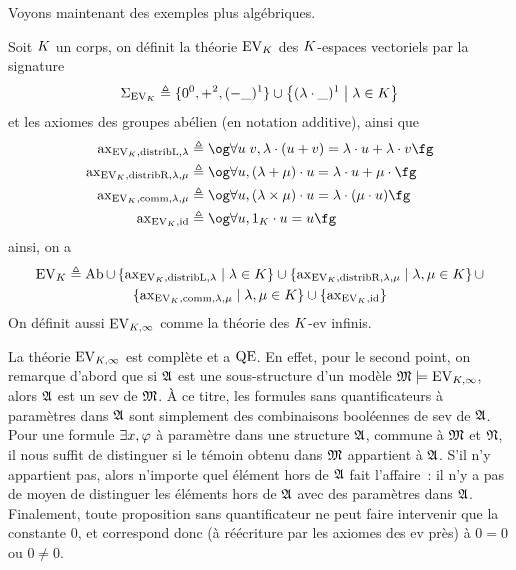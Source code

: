\noindent
Voyons maintenant des exemples plus algébriques.

\begin{example}
  Soit $K$ un corps, on définit la théorie $\operatorname{EV}_{K}$ des
  $K$-espaces vectoriels par la signature
  \[\Sigma_{\operatorname{EV}_{K}} \triangleq \{ 0^0, +^{2}, (-\mathord{\_})^1\}\cup
  \left\{ (\lambda\mathbin{\cdot}\mathord{\_})^1 \;\middle\vert\; \lambda\in K \right\}\]
  et les axiomes des groupes abélien (en notation additive), ainsi que
  \begin{align*}
    \Rax_{\EV_{\varKK},\distrL,\lambda} &\defeq \ogM \forall u\;v,
    \lambda\mathbin{\cdot}(u+v) = \lambda\mathbin{\cdot} u +
    \lambda\mathbin{\cdot} v\fgM\\
    \Rax_{\EV_{\varKK},\distrR,\lambda,\mu} &\defeq
    \ogM\forall u, (\lambda + \mu)\mathbin{\cdot} u =
    \lambda\mathbin{\cdot} u + \mu\mathbin{\cdot}\fgM\\
    \Rax_{\EV_{\varKK},\comm,\lambda,\mu} & \defeq \ogM
    \forall u, (\lambda \times \mu)\mathbin{\cdot} u =
    \lambda\mathbin{\cdot}(\mu\mathbin{\cdot} u)\fgM\\
    \Rax_{\EV_{\varKK},\id} &\defeq
    \ogM \forall u, 1_{\varKK} \mathbin{\cdot} u = u\fgM
  \end{align*}
  ainsi, on a
  \begin{multline*}
    \operatorname{EV}_{K} \triangleq \operatorname{Ab} \cup
    \left\{ \operatorname{ax}_{\operatorname{EV}_K,\operatorname{distribL},\lambda} \;\middle\vert\; \lambda\in K \right\}\cup
    \left\{ \operatorname{ax}_{\operatorname{EV}_{K},\operatorname{distribR},\lambda,\mu} \;\middle\vert\; \lambda,\mu\in K \right\}\cup\\
    \left\{ \operatorname{ax}_{\operatorname{EV}_{K},\operatorname{comm},\lambda,\mu} \;\middle\vert\; \lambda,\mu\in K \right\}\cup
    \{\operatorname{ax}_{\operatorname{EV}_{K},\operatorname{id}}\}
  \end{multline*}
  On définit aussi $\operatorname{EV}_{K,\infty}$ comme la théorie des $K$-ev infinis.

  La théorie $\operatorname{EV}_{K,\infty}$ est complète et a $\operatorname{QE}$. En effet, pour le
  second point, on remarque d'abord que si $\mathfrak{A}$ est une sous-structure d'un
  modèle $\mathfrak{M}\models\operatorname{EV}_{K,\infty}$, alors $\mathfrak{A}$ est un sev de $\mathfrak{M}$.
  \`A ce titre, les formules sans quantificateurs à paramètres dans $\mathfrak{A}$
  sont simplement des combinaisons booléennes de sev de $\mathfrak{A}$. Pour une
  formule $\exists x, \varphi$ à paramètre dans une structure $\mathfrak{A}$, commune
  à $\mathfrak{M}$ et $\mathfrak{N}$, il nous suffit de distinguer si le témoin obtenu
  dans $\mathfrak{M}$ appartient à $\mathfrak{A}$. S'il n'y appartient pas, alors n'importe
  quel élément hors de $\mathfrak{A}$ fait l'affaire~: il n'y a pas de moyen de
  distinguer les éléments hors de $\mathfrak{A}$ avec des paramètres dans $\mathfrak{A}$.
  Finalement, toute proposition sans quantificateur ne peut faire intervenir
  que la constante $0$, et correspond donc (à réécriture par les axiomes des
  ev près) à $0 = 0$ ou $0 \neq 0$.
\end{example}

